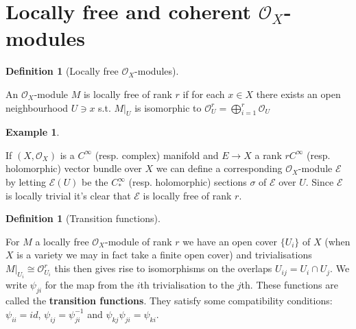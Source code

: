 \documentclass[10pt,]{book}
\newcommand{\terminology}[1]{\textbf{#1}}
\theoremstyle{plain}
\theoremstyle{definition}
\newtheorem{definition}[theorem]{Definition}
\newtheorem{example}[theorem]{Example}
\newcommand{\id}{id}
\newcommand{\C}{C_*}
\newcommand{\E}{\mathcal{E}}
\newcommand{\cO}{\mathcal{O}}
\begin{document}
\section[Locally free and coherent \(\cO_X\)-modules]{Locally free and coherent \(\cO_X\)-modules}\label{sec-ox-modules}
\begin{definition}[Locally free \(\cO_X\)-modules]\label{definition-16}

            An \(\cO_X\)-module \(M\) is locally free of rank \(r\) if for each \(x\in X\) there exists an open neighbourhood \(U \ni x\) s.t. \(M|_U\) is isomorphic to \(\cO_U^r = \bigoplus_{i=1}^r \cO_U\)\end{definition}
\begin{example}\label{example-11}

            If \((X, \cO_X)\) is a \(C^\infty\) (resp. complex) manifold and \(E \to X\) a rank \(r\)\(C^\infty\) (resp. holomorphic) vector bundle over \(X\) we can define a corresponding \(\cO_X\)-module \(\E\) by letting \(\E(U)\) be the \(\C^\infty\) (resp. holomorphic) sections \(\sigma\) of \(\E\) over \(U\).
            Since \(\E\) is locally trivial it's clear that \(\E\) is locally free of rank \(r\).
          \end{example}
\begin{definition}[Transition functions]\label{definition-17}

            For \(M\) a locally free \(\cO_X\)-module of rank \(r\) we have an open cover \(\{U_i\}\) of \(X\) (when \(X\) is a variety we may in fact take a finite open cover) and trivialisations \(M|_{U_i} \cong \cO_{U_i}^r\) this then gives rise to isomorphisms on the overlaps \(U_{ij} = U_i \cap U_j\).
            We write \(\psi_{ji}\) for the map from the \(i\)th trivialisation to the \(j\)th.
            These functions are called the \terminology{transition functions}.
            They satisfy some compatibility conditions:
            \(\psi_{ii} = \id\), \(\psi_{ij} = \psi_{ji}^{-1}\) and \(\psi_{kj}\psi_{ji} = \psi_{ki}\).
          \end{definition}
%
\backmatter
%
\end{document}
